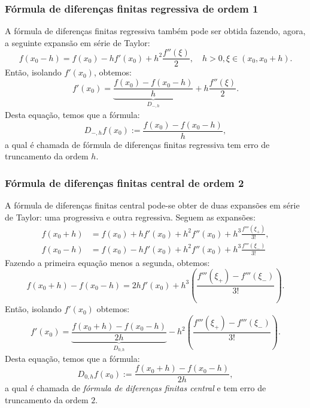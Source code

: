 \subsubsection{Fórmula de diferenças finitas regressiva de ordem 1}

A fórmula de diferenças finitas regressiva também pode ser obtida fazendo, agora, a seguinte expansão em série de Taylor:
\begin{equation*}
  f(x_0-h) = f(x_0) - hf'(x_0) + h^2\frac{f''(\xi)}{2},\quad h>0, \xi\in(x_0, x_0+h).
\end{equation*}
Então, isolando $f'(x_0)$, obtemos:
\begin{equation*}
  f'(x_0) = \underbrace{\frac{f(x_0) - f(x_0-h)}{h}}_{D_{-,h}} + h\frac{f''(\xi)}{2}.
\end{equation*}
Desta equação, temos que a fórmula:
\begin{equation*}
  D_{-,h}f(x_0) := \frac{f(x_0)-f(x_0-h)}{h},
\end{equation*}
a qual é chamada de fórmula de diferenças finitas regressiva tem erro de truncamento da ordem $h$.

\subsubsection{Fórmula de diferenças finitas central de ordem 2}

A fórmula de diferenças finitas central pode-se obter de duas expansões em série de Taylor: uma progressiva e outra regressiva. Seguem as expansões:
\begin{equation*}
  \begin{split}
    f(x_0+h) &= f(x_0) + hf'(x_0) + h^2f''(x_0) + h^3\frac{f'''(\xi_{+})}{3!},\\
    f(x_0-h) &= f(x_0) - hf'(x_0) + h^2f''(x_0) + h^3\frac{f'''(\xi_{-})}{3!}
  \end{split}
\end{equation*}
Fazendo a primeira equação menos a segunda, obtemos:
\begin{equation*}
  f(x_0+h)-f(x_0-h) = 2hf'(x_0) + h^{3}\left(\frac{f'''(\xi_{+}) - f'''(\xi_{-})}{3!}\right).
\end{equation*}
Então, isolando $f'(x_0)$ obtemos:
\begin{equation*}
  f'(x_0) = \underbrace{\frac{f(x_0+h) - f(x_0-h)}{2h}}_{D_{0,h}} - h^2\left(\frac{f'''(\xi_+) - f'''(\xi_-)}{3!}\right).
\end{equation*}
Desta equação, temos que a fórmula:
\begin{equation*}
  D_{0,h}f(x_0) := \frac{f(x_0+h)-f(x_0-h)}{2h},
\end{equation*}
a qual é chamada de \emph{fórmula de diferenças finitas central} e tem erro de truncamento da ordem $2$.

